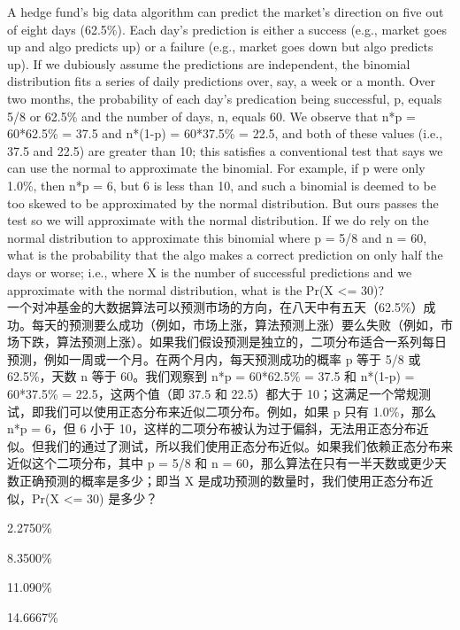\documentclass{article}
\newcounter{question} %
\begin{document}
\begin{question}
    A hedge fund’s big data algorithm can predict the market’s direction on five out of eight days (62.5\%). Each day’s prediction is either a
    success (e.g., market goes up and algo predicts up) or a failure (e.g., market goes down but algo predicts up). If we dubiously assume the
    predictions are independent, the binomial distribution fits a series of daily predictions over, say, a week or a month. Over two months, the
    probability of each day’s predication being successful, p, equals 5/8 or 62.5\% and the number of days, n, equals 60. We observe that n*p =
    60*62.5\% = 37.5 and n*(1-p) = 60*37.5\% = 22.5, and both of these values (i.e., 37.5 and 22.5) are greater than 10; this satisfies a conventional
    test that says we can use the normal to approximate the binomial. For example, if p were only 1.0\%, then n*p = 6, but 6 is less than 10, and
    such a binomial is deemed to be too skewed to be approximated by the normal distribution. But ours passes the test so we will
    approximate with the normal distribution. If we do rely on the normal distribution to approximate this binomial where p = 5/8 and n = 60,
    what is the probability that the algo makes a correct prediction on only half the days or worse; i.e., where X is the number of successful
    predictions and we approximate with the normal distribution, what is the Pr(X <= 30)?
    \\一个对冲基金的大数据算法可以预测市场的方向，在八天中有五天（62.5\%）成功。每天的预测要么成功（例如，市场上涨，算法预测上涨）要么失败（例如，市场下跌，算法预测上涨）。如果我们假设预测是独立的，二项分布适合一系列每日预测，例如一周或一个月。在两个月内，每天预测成功的概率 p 等于 5/8 或 62.5\%，天数 n 等于 60。我们观察到 n*p = 60*62.5\% = 37.5 和 n*(1-p) = 60*37.5\% = 22.5，这两个值（即 37.5 和 22.5）都大于 10；这满足一个常规测试，即我们可以使用正态分布来近似二项分布。例如，如果 p 只有 1.0\%，那么 n*p = 6，但 6 小于 10，这样的二项分布被认为过于偏斜，无法用正态分布近似。但我们的通过了测试，所以我们使用正态分布近似。如果我们依赖正态分布来近似这个二项分布，其中 p = 5/8 和 n = 60，那么算法在只有一半天数或更少天数正确预测的概率是多少；即当 X 是成功预测的数量时，我们使用正态分布近似，Pr(X <= 30) 是多少？
    \end{question}

\begin{choices}
    \item 2.2750\%
    
    \item 8.3500\%
    
    \item 11.090\%
    
    \item 14.6667\%
\end{choices}
\end{document}
